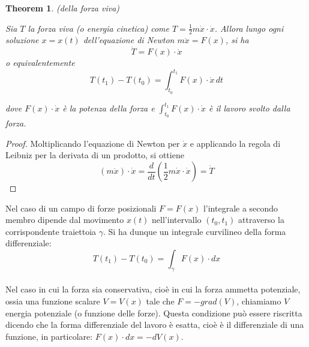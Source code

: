 \documentclass{article}
\newtheorem{theorem}{Theorem}[section]
\begin{document}
            \begin{theorem}(della forza viva)
                \label{thm:Forza viva}

                Sia $T$ la forza viva (o energia cinetica) come $T = \frac{1}{2}m \dot{x} \cdot \dot{x}$.
                Allora lungo ogni soluzione $x = x(t)$ dell'equazione di Newton $m \ddot{x} = F(x)$, si ha 
                \[ \dot{T} = F(x) \cdot \dot{x} \] o equivalentemente \[ T(t_1) - T(t_0) = \int_{t_0}^{t_1} F(x) \cdot \dot{x} \, dt \]

                dove $F(x) \cdot \dot{x}$ è la potenza della forza e $\int_{t_0}^{t_1} F(x) \cdot \dot{x}$ è il lavoro svolto dalla forza. 

            \end{theorem}
            \begin{proof}

                Moltiplicando l'equazione di Newton per $\dot{x}$ e applicando la regola di Leibniz per la derivata di un prodotto, si ottiene
                \[ (m \ddot{x}) \cdot \dot{x} = \frac{d}{dt}(\frac{1}{2} m \dot{x} \cdot \dot{x}) = \dot{T} \]

            \end{proof} 

            Nel caso di un campo di forze posizionali $F = F(x)$ l'integrale a secondo membro dipende dal movimento $x(t)$ nell'intervallo $(t_0, t_1)$ 
            attraverso la corrispondente traiettoia $\gamma$. Si ha dunque un integrale curvilineo della forma differenziale: 
            \[ T(t_1) - T(t_0) = \int_{\gamma} F(x) \cdot dx \]  \\
            Nel caso in cui la forza sia conservativa, cioè in cui la forza ammetta potenziale, ossia una funzione scalare $V = V(x)$ tale che $F = - grad(V)$, 
            chiamiamo $V$ energia potenziale (o funzione delle forze). Questa condizione può essere riscritta dicendo che la forma differenziale del lavoro 
            è esatta, cioè è il differenziale di una funzione, in particolare: $F(x) \cdot dx = -dV(x)$. \\
\end{document}

